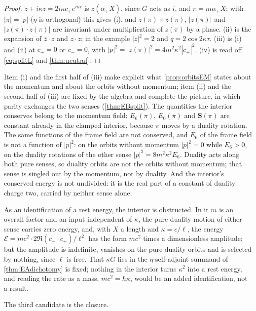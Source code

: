 \begin{proof}
$\dot z+i\kappa z=2i\kappa c_+e^{i\kappa\tau}$ is $z(\alpha_+X)$, since $G$ acts as $i$, and $\pi=m\alpha_+X$; with $|\pi|=|p|$ ($\eta$ is orthogonal)
this gives (i), and $\overline{z(\pi)}\times z(\pi)$, $|z(\pi)|$ and $|z(\pi)\cdot z(\pi)|$ are invariant under multiplication of $z(\pi)$ by a phase. (ii) is the
expansion of $\bar z\cdot z$ and $z\cdot z$; in the example $|z|^2=2$ and $q=2\cos2\kappa\tau$. (iii) is (i) and (ii) at $c_+=0$ or $c_-=0$, with
$|p|^2=|z(\pi)|^2=4m^2\kappa^2|c_+|^2$. (iv) is read off \eqref{eq:splitL} and \cref{thm:neutral}.
\end{proof}

Item (i) and the first half of (iii) make explicit what \cref{prop:orbitsEM} states about the momentum and about the orbits without momentum;
item (ii) and the second half of (iii) are fixed by the algebra and complete the picture, in which parity exchanges the two senses
(\cref{thm:EBsplit}). The
quantities the interior conserves belong to the momentum field: $E_6(\pi)$, $E_0(\pi)$ and $\mathbf S(\pi)$ are constant already in the clamped
interior, because $\pi$ moves by a duality rotation. The same functions of the frame field are not conserved, and $E_6$ of the frame field is not a
function of $|p|^2$: on the orbits without momentum $|p|^2=0$ while $E_6>0$, on the duality rotations of the other sense $|p|^2=8m^2\kappa^2E_6$.
Duality acts along both pure senses, so duality orbits are not the orbits without momentum; that sense is singled out by the momentum, not by
duality. And the interior's conserved energy is not undivided: it is the real part of a constant of duality charge two, carried by neither sense
alone.

As an identification of a rest energy, the interior is obstructed. In it $m$ is an overall factor and an input independent of $\kappa$, the pure
duality motion of either sense carries zero energy, and, with $X$ a length and $\kappa=c/\ell$, the energy
$\mathcal E=mc^2\cdot2\Re(c_-\cdot c_+)/\ell^2$ has the form $mc^2$ times a dimensionless amplitude; but the amplitude is indefinite, vanishes on the
pure duality orbits and is selected by nothing, since $\ell$ is free. That $\kappa G$ lies in the $\eta$-self-adjoint summand of
\cref{thm:EAdichotomy} is fixed; nothing in the interior turns $\kappa^2$ into a rest energy, and reading the rate as a mass, $mc^2=\hbar\kappa$, would
be an added identification, not a result.

The third candidate is the closure.

